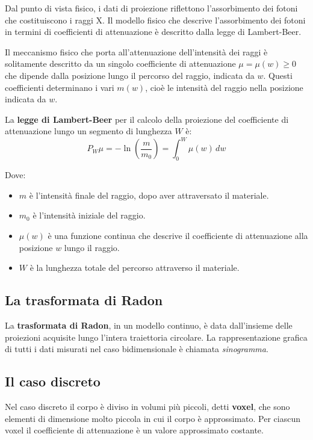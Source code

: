 \documentclass[12pt,a4paper]{report}
\begin{document}
Dal punto di vista fisico, i dati di proiezione riflettono l'assorbimento dei fotoni che costituiscono i raggi X.
Il modello fisico che descrive l'assorbimento dei fotoni in termini di coefficienti di attenuazione è descritto dalla legge di
Lambert-Beer.

Il meccanismo fisico che porta all'attenuazione dell'intensità dei raggi è solitamente descritto da un singolo coefficiente di
attenuazione \(\mu = \mu(w) \ge 0\) che dipende dalla posizione lungo il percorso del raggio, indicata da \(w\).
Questi coefficienti determinano i vari \(m(w)\), cioè le intensità del raggio nella posizione indicata da \(w\).

La \textbf{legge di Lambert-Beer} per il calcolo della proiezione del coefficiente di attenuazione lungo un segmento di lunghezza
\(W\) è:
\begin{equation} \label{eq:law_lambert-beer}
  P_W\mu = - \ln{(\frac{m}{m_0})} = \int_0^W \mu(w) \, dw
\end{equation}

Dove:
\begin{itemize}
  \item \(m\) è l'intensità finale del raggio, dopo aver attraversato il materiale.
  \item \(m_0\) è l'intensità iniziale del raggio.
  \item \(\mu(w)\) è una funzione continua che descrive il coefficiente di attenuazione alla posizione \(w\) lungo il raggio.
  \item \(W\) è la lunghezza totale del percorso attraverso il materiale.
\end{itemize}

\subsection{La trasformata di Radon}

La \textbf{trasformata di Radon}, in un modello continuo, è data dall'insieme delle proiezioni acquisite lungo l'intera
traiettoria circolare.
La rappresentazione grafica di tutti i dati misurati nel caso bidimensionale è chiamata \textit{sinogramma}.

\subsection{Il caso discreto}

Nel caso discreto il corpo è diviso in volumi più piccoli, detti \textbf{voxel}, che sono elementi di dimensione molto piccola in
cui il corpo è approssimato.
Per ciascun voxel il coefficiente di attenuazione è un valore approssimato costante.
\end{document}
